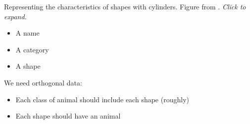 \documentclass[
  authoryear]{elsarticle}
\begin{document}
\begin{marginfigure}


\caption{\label{fig-marr}Representing the characteristics of shapes with
cylinders. Figure from \citet{marr1997}. \emph{Click to expand.}}

\end{marginfigure}%

\begin{itemize}
\item
  A name
\item
  A category
\item
  A shape
\end{itemize}

We need orthogonal data:

\begin{itemize}
\item
  Each class of animal should include each shape (roughly)
\item
  Each shape should have an animal
\end{itemize}
\end{document}
